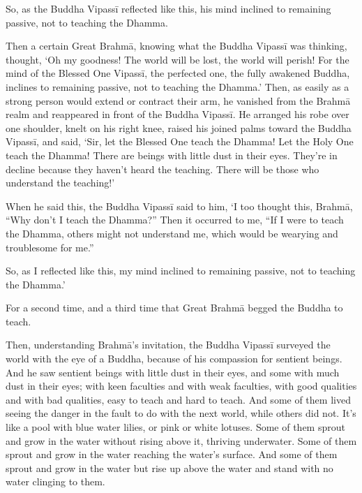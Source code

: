 \documentclass[12pt,openany]{book}%
\begin{document}
So, as the Buddha \textsanskrit{Vipassī} reflected like this, his mind inclined to remaining passive, not to teaching the Dhamma. 

Then a certain Great \textsanskrit{Brahmā}, knowing what the Buddha \textsanskrit{Vipassī} was thinking, thought, ‘Oh my goodness! The world will be lost, the world will perish! For the mind of the Blessed One \textsanskrit{Vipassī}, the perfected one, the fully awakened Buddha, inclines to remaining passive, not to teaching the Dhamma.’ Then, as easily as a strong person would extend or contract their arm, he vanished from the \textsanskrit{Brahmā} realm and reappeared in front of the Buddha \textsanskrit{Vipassī}. He arranged his robe over one shoulder, knelt on his right knee, raised his joined palms toward the Buddha \textsanskrit{Vipassī}, and said, ‘Sir, let the Blessed One teach the Dhamma! Let the Holy One teach the Dhamma! There are beings with little dust in their eyes. They’re in decline because they haven’t heard the teaching. There will be those who understand the teaching!’ 

When he said this, the Buddha \textsanskrit{Vipassī} said to him, ‘I too thought this, \textsanskrit{Brahmā}, “Why don’t I teach the Dhamma?” Then it occurred to me, “If I were to teach the Dhamma, others might not understand me, which would be wearying and troublesome for me.” 

So, as I reflected like this, my mind inclined to remaining passive, not to teaching the Dhamma.’ 

For a second time, and a third time that Great \textsanskrit{Brahmā} begged the Buddha to teach. 

Then, understanding \textsanskrit{Brahmā}’s invitation, the Buddha \textsanskrit{Vipassī} surveyed the world with the eye of a Buddha, because of his compassion for sentient beings. And he saw sentient beings with little dust in their eyes, and some with much dust in their eyes; with keen faculties and with weak faculties, with good qualities and with bad qualities, easy to teach and hard to teach. And some of them lived seeing the danger in the fault to do with the next world, while others did not. It’s like a pool with blue water lilies, or pink or white lotuses. Some of them sprout and grow in the water without rising above it, thriving underwater. Some of them sprout and grow in the water reaching the water’s surface. And some of them sprout and grow in the water but rise up above the water and stand with no water clinging to them. 
\end{document}
